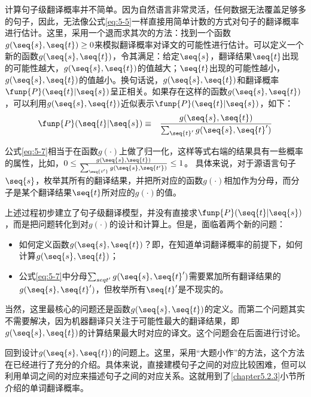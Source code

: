 \parinterval 计算句子级翻译概率并不简单。因为自然语言非常灵活，任何数据无法覆盖足够多的句子，因此，无法像公式\eqref{eq:5-5}一样直接用简单计数的方式对句子的翻译概率进行估计。这里，采用一个退而求其次的方法：找到一个函数$g(\seq{s},\seq{t})\ge 0$来模拟翻译概率对译文的可能性进行估计。可以定义一个新的函数$g(\seq{s},\seq{t})$，令其满足：给定$\seq{s}$，翻译结果$\seq{t}$出现的可能性越大，$g(\seq{s},\seq{t})$的值越大；$\seq{t}$出现的可能性越小，$g(\seq{s},\seq{t})$的值越小。换句话说，$g(\seq{s},\seq{t})$和翻译概率$\funp{P}(\seq{t}|\seq{s})$呈正相关。如果存在这样的函数$g(\seq{s},\seq{t}
)$，可以利用$g(\seq{s},\seq{t})$近似表示$\funp{P}(\seq{t}|\seq{s})$，如下：
\begin{eqnarray}
\funp{P}(\seq{t}|\seq{s}) & \equiv & \frac{g(\seq{s},\seq{t})}{\sum_{\seq{t}'}g(\seq{s},\seq{t}')}
\label{eq:5-7}
\end{eqnarray}

\parinterval 公式\eqref{eq:5-7}相当于在函数$g(\cdot)$上做了归一化，这样等式右端的结果具有一些概率的属性，比如，$0 \le \frac{g(\seq{s},\seq{t})}{\sum_{\seq{t'}}g(\seq{s},\seq{t'})} \le 1$。 具体来说，对于源语言句子$\seq{s}$，枚举其所有的翻译结果，并把所对应的函数$g(\cdot)$相加作为分母，而分子是某个翻译结果$\seq{t}$所对应的$g(\cdot)$的值。

\parinterval 上述过程初步建立了句子级翻译模型，并没有直接求$\funp{P}(\seq{t}|\seq{s})$，而是把问题转化到对$g(\cdot)$的设计和计算上。但是，面临着两个新的问题：

\begin{itemize}
\vspace{0.5em}
\item 如何定义函数$g(\seq{s},\seq{t})$？即，在知道单词翻译概率的前提下，如何计算$g(\seq{s},\seq{t})$；
\vspace{0.5em}
\item 公式\eqref{eq:5-7}中分母$\sum_{seq{t'}}g(\seq{s},{\seq{t}'})$需要累加所有翻译结果的$g(\seq{s},{\seq{t}'})$，但枚举所有${\seq{t}'}$是不现实的。
\vspace{0.5em}
\end{itemize}

\parinterval  当然，这里最核心的问题还是函数$g(\seq{s},\seq{t})$的定义。而第二个问题其实不需要解决，因为机器翻译只关注于可能性最大的翻译结果，即$g(\seq{s},\seq{t})$的计算结果最大时对应的译文。这个问题会在后面进行讨论。

\parinterval 回到设计$g(\seq{s},\seq{t})$的问题上。这里，采用“大题小作”的方法，这个方法在{\chaptertwo}已经进行了充分的介绍。具体来说，直接建模句子之间的对应比较困难，但可以利用单词之间的对应来描述句子之间的对应关系。这就用到了\ref{chapter5.2.3}小节所介绍的单词翻译概率。

